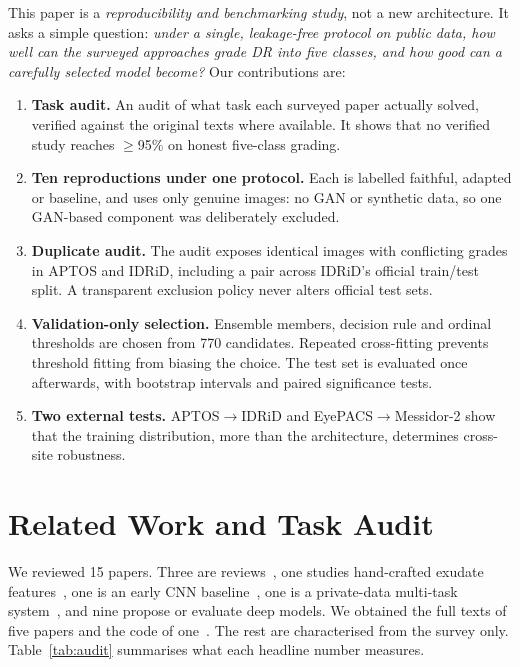 \documentclass[journal]{IEEEtran}
\begin{document}
This paper is a \emph{reproducibility and benchmarking study}, not a new architecture. It asks a
simple question: \emph{under a single, leakage-free protocol on public data, how
well can the surveyed approaches grade DR into five classes, and how good can a carefully selected
model become?} Our contributions are:
\begin{enumerate}
\item \textbf{Task audit.} An audit of what task each surveyed paper actually solved, verified
against the original texts where available. It shows that no verified study reaches $\geq$95\% on
honest five-class grading.
\item \textbf{Ten reproductions under one protocol.} Each is labelled faithful, adapted or baseline,
and uses only genuine images: no GAN or synthetic data, so one GAN-based component was deliberately
excluded.
\item \textbf{Duplicate audit.} The audit exposes identical images with conflicting grades in APTOS
and IDRiD, including a pair across IDRiD's official train/test split. A transparent exclusion policy
never alters official test sets.
\item \textbf{Validation-only selection.} Ensemble members, decision rule and ordinal thresholds are
chosen from 770 candidates. Repeated cross-fitting prevents threshold fitting from biasing the
choice. The test set is evaluated once afterwards, with bootstrap intervals and paired significance
tests.
\item \textbf{Two external tests.} APTOS$\rightarrow$IDRiD and EyePACS$\rightarrow$Messidor-2 show
that the training distribution, more than the architecture, determines cross-site robustness.
\end{enumerate}

\section{Related Work and Task Audit}
\label{sec:related}
We reviewed 15 papers. Three are reviews~\cite{dejene2025screening,tato2025review,subramanian2022styles},
one studies hand-crafted exudate features~\cite{sisodia2017preprocessing}, one is an early CNN
baseline~\cite{pratt2016cnn}, one is a private-data multi-task system~\cite{dai2021deepdr}, and nine
propose or evaluate deep models. We obtained the full texts of five papers
\cite{butt2022hybrid,gulshan2016development,zafar2025lightweight,yaqoob2021resnet,papadopoulos2021mil}
and the code of one~\cite{abbasi2025adaptive}. The rest are characterised from the survey only.
Table~\ref{tab:audit} summarises what each headline number measures.
\end{document}
